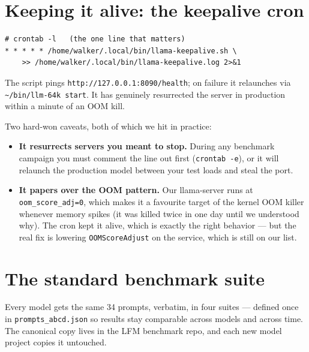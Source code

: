 \documentclass[11pt,a4paper]{article}
\begin{document}
\section{Keeping it alive: the keepalive cron}

\begin{lstlisting}
# crontab -l   (the one line that matters)
* * * * * /home/walker/.local/bin/llama-keepalive.sh \
    >> /home/walker/.local/bin/llama-keepalive.log 2>&1
\end{lstlisting}

The script pings \texttt{http://127.0.0.1:8090/health}; on failure it
relaunches via \texttt{\textasciitilde/bin/llm-64k start}. It has genuinely
resurrected the server in production within a minute of an OOM kill.

Two hard-won caveats, both of which we hit in practice:

\begin{itemize}[leftmargin=1.4em,itemsep=1pt]
  \item \textbf{It resurrects servers you meant to stop.} During any
        benchmark campaign you must comment the line out first
        (\texttt{crontab -e}), or it will relaunch the production model
        between your test loads and steal the port.
  \item \textbf{It papers over the OOM pattern.} Our llama-server runs at
        \texttt{oom\_score\_adj=0}, which makes it a favourite target of the
        kernel OOM killer whenever memory spikes (it was killed twice in one
        day until we understood why). The cron kept it alive, which is
        exactly the right behavior --- but the real fix is lowering
        \texttt{OOMScoreAdjust} on the service, which is still on our list.
\end{itemize}

\section{The standard benchmark suite}
\label{sec:suite}

\begin{sloppypar}
Every model gets the same 34 prompts, verbatim, in four suites --- defined
once in \texttt{prompts\_abcd.json} so results stay comparable across models
and across time. The canonical copy lives in the LFM benchmark repo, and each
new model project copies it untouched.
\end{sloppypar}
\end{document}
